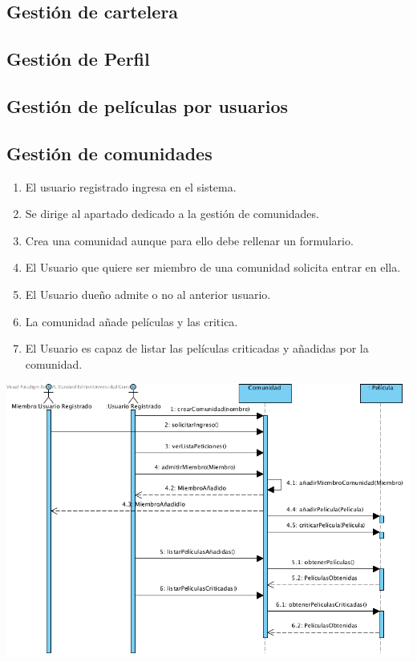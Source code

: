\documentclass{article}
\begin{document}
	\subsection*{Gestión de cartelera}
	\subsection*{Gestión de Perfil}
	\subsection*{Gestión de películas por usuarios}
	\subsection*{Gestión de comunidades}
	\begin{enumerate}
		\item El usuario registrado ingresa en el sistema.
		\item Se dirige al apartado dedicado a la gestión de comunidades.
		\item Crea una comunidad aunque para ello debe rellenar un formulario.
		\item El Usuario que quiere ser miembro de una comunidad solicita entrar en ella.
		\item El Usuario dueño admite o no al anterior usuario.
		\item La comunidad añade películas y las critica.
		\item El Usuario es capaz de listar las películas criticadas y añadidas por la comunidad.
	\end{enumerate}
		\includegraphics[width=1\linewidth]{./S-Comunidades}
\end{document}
